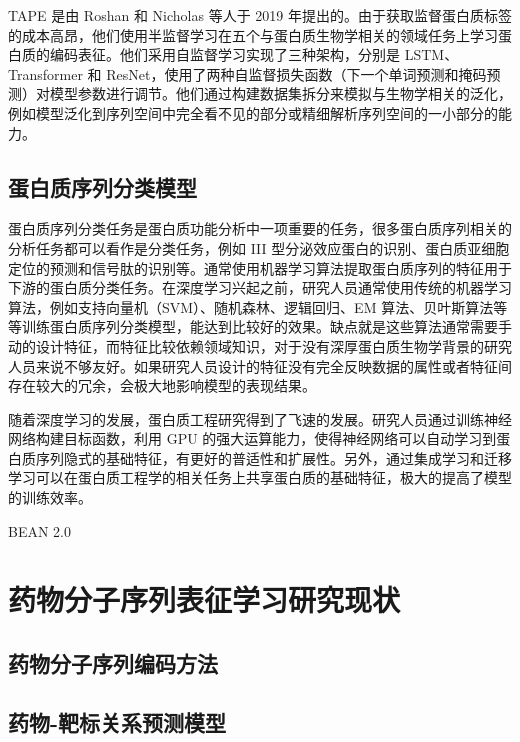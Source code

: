 TAPE \cite{rao2019evaluating} 是由 Roshan 和 Nicholas 等人于 2019 年提出的。由于获取监督蛋白质标签的成本高昂，他们使用半监督学习在五个与蛋白质生物学相关的领域任务上学习蛋白质的编码表征。他们采用自监督学习实现了三种架构，分别是 LSTM、Transformer 和 ResNet，使用了两种自监督损失函数（下一个单词预测和掩码预测）对模型参数进行调节。他们通过构建数据集拆分来模拟与生物学相关的泛化，例如模型泛化到序列空间中完全看不见的部分或精细解析序列空间的一小部分的能力。


\subsection{蛋白质序列分类模型}
蛋白质序列分类任务是蛋白质功能分析中一项重要的任务，很多蛋白质序列相关的分析任务都可以看作是分类任务，例如 III 型分泌效应蛋白的识别、蛋白质亚细胞定位的预测和信号肽的识别等。通常使用机器学习算法提取蛋白质序列的特征用于下游的蛋白质分类任务。在深度学习兴起之前，研究人员通常使用传统的机器学习算法，例如支持向量机（SVM）、随机森林、逻辑回归、EM 算法、贝叶斯算法等等训练蛋白质序列分类模型，能达到比较好的效果。缺点就是这些算法通常需要手动的设计特征，而特征比较依赖领域知识，对于没有深厚蛋白质生物学背景的研究人员来说不够友好。如果研究人员设计的特征没有完全反映数据的属性或者特征间存在较大的冗余，会极大地影响模型的表现结果。

随着深度学习的发展，蛋白质工程研究得到了飞速的发展。研究人员通过训练神经网络构建目标函数，利用 GPU 的强大运算能力，使得神经网络可以自动学习到蛋白质序列隐式的基础特征，有更好的普适性和扩展性。另外，通过集成学习和迁移学习可以在蛋白质工程学的相关任务上共享蛋白质的基础特征，极大的提高了模型的训练效率。

BEAN 2.0 \cite{}



\section{药物分子序列表征学习研究现状}

\subsection{药物分子序列编码方法}


\subsection{药物-靶标关系预测模型}




